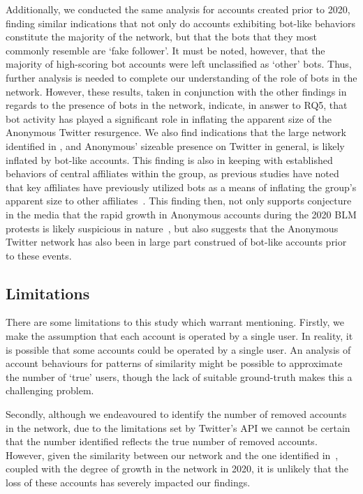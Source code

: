 \documentclass[letterpaper]{article}
\begin{document}
\vspace{-1.05mm}
\vspace{-1.74mm}
Additionally, we conducted the same analysis for accounts created prior to 2020, finding similar indications that not only do accounts exhibiting bot-like behaviors constitute the majority of the network, but that the bots that they most commonly resemble are `fake follower'. It must be noted, however, that the majority of high-scoring bot accounts were left unclassified as `other' bots. Thus, further analysis is needed to complete our understanding of the role of bots in the network.  However, these results, taken in conjunction with the other findings in regards to the presence of bots in the network, indicate, in answer to RQ5, that bot activity has played a significant role in inflating the apparent size of the Anonymous Twitter resurgence. We also find indications that the large network identified in \cite{Jones2020}, and Anonymous' sizeable presence on Twitter in general, is likely inflated by bot-like accounts. This finding is also in keeping with established behaviors of central affiliates within the group, as previous studies have noted that key affiliates have previously utilized bots as a means of inflating the group's apparent size to other affiliates~\cite{Olson2013}. This finding then, not only supports conjecture in the media that the rapid growth in Anonymous accounts during the 2020 BLM protests is likely suspicious in nature~\cite{Telegraph2020}, but also suggests that the Anonymous Twitter network has also been in large part construed of bot-like accounts prior to these events.

\vspace{-0.75mm}
\subsection{Limitations}

There are some limitations to this study which warrant mentioning. Firstly, we make the assumption that each account is operated by a single user. In reality, it is possible that some accounts could be operated by a single user. An analysis of account behaviours for patterns of similarity might be possible to approximate the number of `true' users, though the lack of suitable ground-truth makes this a challenging problem.

Secondly, although we endeavoured to identify the number of removed accounts in the network, due to the limitations set by Twitter's API we cannot be certain that the number identified reflects the true number of removed accounts. However, given the similarity between our network and the one identified in~\cite{Jones2020}, coupled with the degree of growth in the network in 2020, it is unlikely that the loss of these accounts has severely impacted our findings.
\end{document}
